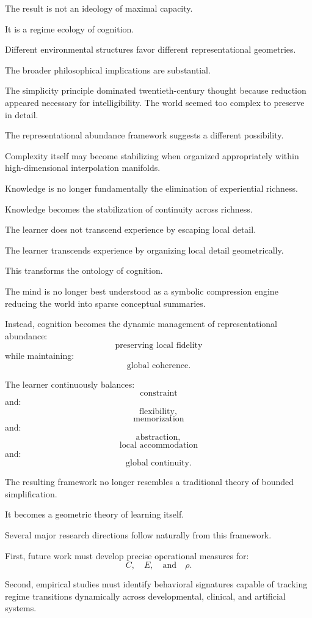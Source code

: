 \documentclass[12pt,a4paper]{article}
\begin{document}
The result is not an ideology of maximal capacity.

It is a regime ecology of cognition.

Different environmental structures favor different representational geometries.

The broader philosophical implications are substantial.

The simplicity principle dominated twentieth-century thought because reduction appeared necessary for intelligibility. The world seemed too complex to preserve in detail.

The representational abundance framework suggests a different possibility.

Complexity itself may become stabilizing when organized appropriately within high-dimensional interpolation manifolds.

Knowledge is no longer fundamentally the elimination of experiential richness.

Knowledge becomes the stabilization of continuity across richness.

The learner does not transcend experience by escaping local detail.

The learner transcends experience by organizing local detail geometrically.

This transforms the ontology of cognition.

The mind is no longer best understood as a symbolic compression engine reducing the world into sparse conceptual summaries.

Instead, cognition becomes the dynamic management of representational abundance:
\[
\text{preserving local fidelity}
\]
while maintaining:
\[
\text{global coherence}.
\]

The learner continuously balances:
\[
\text{constraint}
\]
and:
\[
\text{flexibility},
\]
\[
\text{memorization}
\]
and:
\[
\text{abstraction},
\]
\[
\text{local accommodation}
\]
and:
\[
\text{global continuity}.
\]

The resulting framework no longer resembles a traditional theory of bounded simplification.

It becomes a geometric theory of learning itself.

Several major research directions follow naturally from this framework.

First, future work must develop precise operational measures for:
\[
C,
\quad
E,
\quad
\text{and}
\quad
\rho.
\]

Second, empirical studies must identify behavioral signatures capable of tracking regime transitions dynamically across developmental, clinical, and artificial systems.
\end{document}
